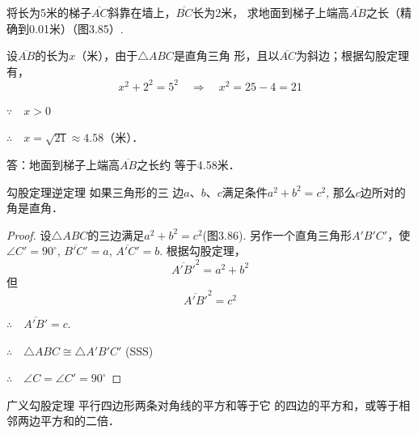 \begin{example}
    将长为5米的梯子$\overline{AC}$斜靠在墙上，$\overline{BC}$长为2米，
求地面到梯子上端高$\overline{AB}$之长（精确到0.01米）（图3.85）.
\end{example}



\begin{solution}
    设$\overline{AB}$的长为$x$（米），由于$\triangle ABC$是直角三角
形，且以$\overline{AC}$为斜边；根据勾股定理有，
\[x^2+2^2=5^2 \quad \Rightarrow\quad x^2=25-4=21\]

$\because\quad x>0$

$\therefore\quad x=\sqrt{21}\approx 4.58$（米）．

答：地面到梯子上端高$\overline{AB}$之长约
等于4.58米．
\end{solution}

\begin{blk}
    {勾股定理逆定理} 如果三角形的三
边$a$、$b$、$c$满足条件$a^2+b^2=c^2$, 那么$c$边所对的角是直角．
\end{blk}


\begin{proof}
设$\triangle ABC$的三边满足$a^2+b^2=c^2$(图3.86). 
另作一个直角三角形$A'B'C'$，使$\angle C'=90^{\circ}$, $\overline{B'C'}=a$,
$\overline{A'C'}=b$. 根据勾股定理，
\[\overline{A' B'}^2=a^2+b^2\]
但
\[\overline{A'B'}^2=c^2\]

$\therefore\quad \overline{A'B'}=c$.

$\therefore\quad \triangle ABC\cong \triangle A'B'C'$ (SSS)

$\therefore\quad \angle C=\angle C'=90^{\circ}$
\end{proof}

\begin{figure}[htp]
    \centering
{}
    \caption{}
\end{figure}

\begin{blk}
    {广义勾股定理} 平行四边形两条对角线的平方和等于它
的四边的平方和，或等于相邻两边平方和的二倍．
\end{blk}

